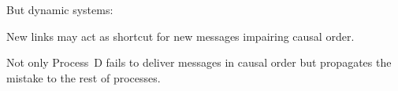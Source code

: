 \documentclass[10pt, xcolor={usenames, dvipsnames}]{beamer}
\newcommand{\xmark}{\ding{55}}
\newcommand{\NO}[1]{\textcolor{red}{#1}}
\begin{document}
\begin{frame}{But dynamic systems: \NO{\xmark}}

  New links may act as shortcut for new messages impairing causal order.

  \begin{minipage}{0.32\textwidth}
    \vspace{1pt}
    \begin{center}
      
    \end{center}
  \end{minipage}
  \begin{minipage}{0.32\textwidth}
    \vspace{1pt}
    \begin{center}
      
    \end{center}
  \end{minipage}
  \begin{minipage}{0.32\textwidth}
    \begin{center}
      
    \end{center}
  \end{minipage}
  
  \begin{center}
  \begin{minipage}{0.35\textwidth}
    \begin{center}
      
    \end{center}
  \end{minipage}
  \begin{minipage}{0.35\textwidth}
    \begin{center}
      
    \end{center}
  \end{minipage}
  \end{center}  

  Not only Process~D fails to deliver messages in causal order but propagates the
  mistake to the rest of processes.

\end{frame}
\end{document}
